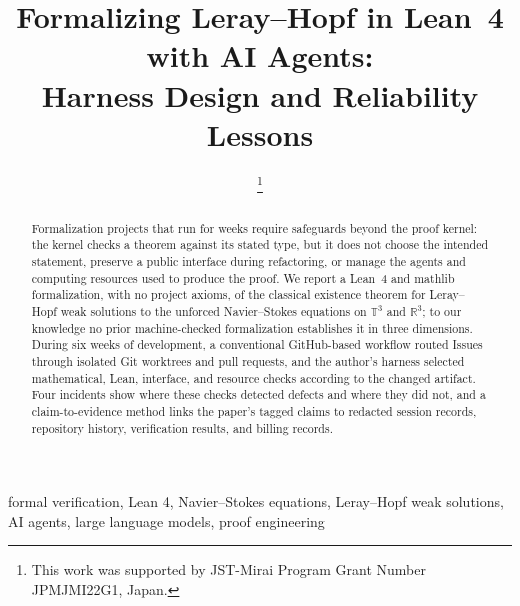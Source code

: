 \documentclass[conference]{IEEEtran}
\newif\ifanonymous%
\begin{document}

\title{Formalizing Leray--Hopf in Lean~4 with AI Agents:\\
Harness Design and Reliability Lessons}

\ifanonymous%
  \author{\IEEEauthorblockN{Anonymous Author(s)}}
\else
  \author{%
    \thanks{This work was supported by JST-Mirai Program Grant Number
      \mbox{JPMJMI22G1}, Japan.}}
\fi

\maketitle

\begin{abstract}
Formalization projects that run for weeks require safeguards beyond the
proof kernel: the kernel checks a theorem against its stated type, but it
does not choose the intended statement, preserve a public interface during
refactoring, or manage the agents and computing resources used to produce
the proof. We report a Lean~4 and mathlib formalization, with no project
axioms, of the classical existence theorem for Leray--Hopf weak solutions
to the unforced Navier--Stokes equations on $\mathbb{T}^3$ and
$\mathbb{R}^3$; to our knowledge no prior machine-checked formalization
establishes it in three dimensions. During
six weeks of development, a conventional GitHub-based workflow routed
Issues through isolated Git worktrees and pull requests, and the author's
harness selected mathematical, Lean, interface, and resource checks
according to the changed artifact. Four
incidents show where these checks detected defects and where they did not,
and a claim-to-evidence method links the paper's tagged claims to
redacted session records, repository history, verification results, and
billing records.
\end{abstract}

\begin{IEEEkeywords}
formal verification, Lean 4, Navier--Stokes equations, Leray--Hopf weak solutions,
AI agents, large language models, proof engineering
\end{IEEEkeywords}










\end{document}
